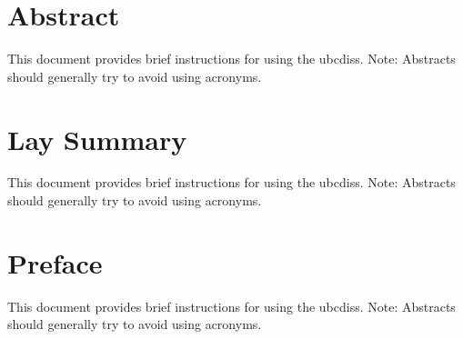 
\chapter*{Abstract}

This document provides brief instructions for using the ubcdiss.
Note: Abstracts should generally try to avoid using acronyms.

\chapter*{Lay Summary}

This document provides brief instructions for using the ubcdiss.
Note: Abstracts should generally try to avoid using acronyms.

\chapter*{Preface}

This document provides brief instructions for using the ubcdiss.
Note: Abstracts should generally try to avoid using acronyms.

